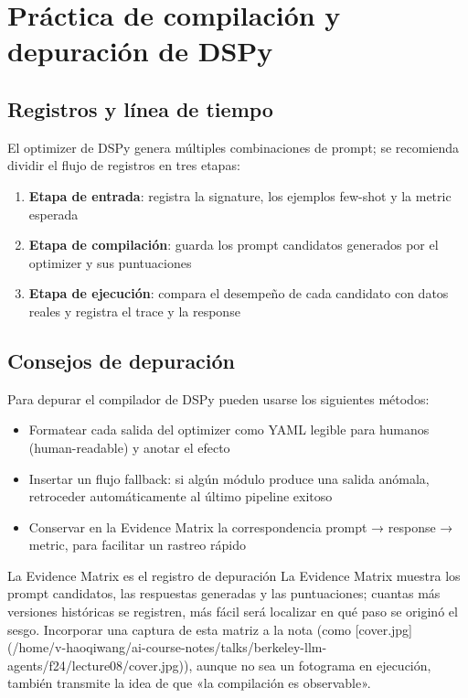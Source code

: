 \section{Práctica de compilación y depuración de DSPy}

\subsection{Registros y línea de tiempo}

El optimizer de DSPy genera múltiples combinaciones de prompt; se recomienda dividir el flujo de registros en tres etapas:

\begin{enumerate}
    \item \textbf{Etapa de entrada}: registra la signature, los ejemplos few-shot y la metric esperada
    \item \textbf{Etapa de compilación}: guarda los prompt candidatos generados por el optimizer y sus puntuaciones
    \item \textbf{Etapa de ejecución}: compara el desempeño de cada candidato con datos reales y registra el trace y la response
\end{enumerate}

\subsection{Consejos de depuración}

Para depurar el compilador de DSPy pueden usarse los siguientes métodos:

\begin{itemize}
    \item Formatear cada salida del optimizer como YAML legible para humanos (human-readable) y anotar el efecto
    \item Insertar un flujo fallback: si algún módulo produce una salida anómala, retroceder automáticamente al último pipeline exitoso
    \item Conservar en la Evidence Matrix la correspondencia prompt → response → metric, para facilitar un rastreo rápido
\end{itemize}

\begin{knowledgebox}{La Evidence Matrix es el registro de depuración}
La Evidence Matrix muestra los prompt candidatos, las respuestas generadas y las puntuaciones; cuantas más versiones históricas se registren, más fácil será localizar en qué paso se originó el sesgo. Incorporar una captura de esta matriz a la nota (como [cover.jpg](/home/v-haoqiwang/ai-course-notes/talks/berkeley-llm-agents/f24/lecture08/cover.jpg)), aunque no sea un fotograma en ejecución, también transmite la idea de que «la compilación es observable».
\end{knowledgebox}


